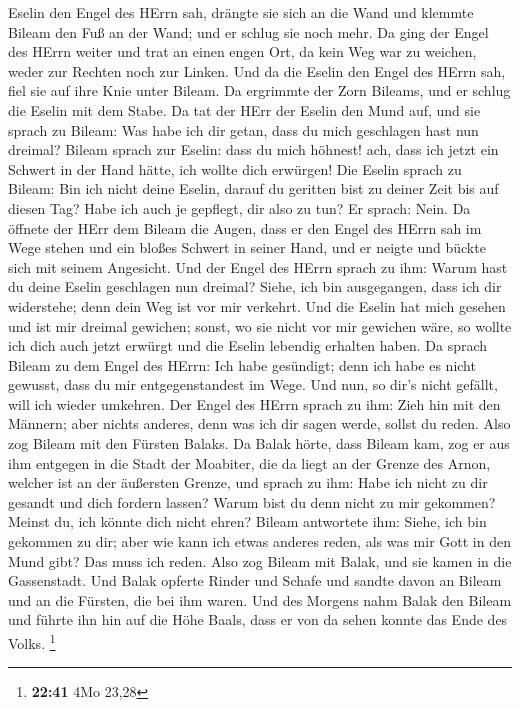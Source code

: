 Eselin den Engel des HErrn sah, drängte sie sich an die Wand und klemmte
Bileam den Fuß an der Wand; und er schlug sie noch mehr. 
Da ging der Engel des HErrn weiter und trat an einen engen Ort, da kein
Weg war zu weichen, weder zur Rechten noch zur Linken.  Und
da die Eselin den Engel des HErrn sah, fiel sie auf ihre Knie unter
Bileam. Da ergrimmte der Zorn Bileams, und er schlug die Eselin mit dem
Stabe.  Da tat der HErr der Eselin den Mund auf, und sie
sprach zu Bileam: Was habe ich dir getan, dass du mich geschlagen hast
nun dreimal?  Bileam sprach zur Eselin: dass du mich
höhnest! ach, dass ich jetzt ein Schwert in der Hand hätte, ich wollte
dich erwürgen!  Die Eselin sprach zu Bileam: Bin ich nicht
deine Eselin, darauf du geritten bist zu deiner Zeit bis auf diesen Tag?
Habe ich auch je gepflegt, dir also zu tun? Er sprach: Nein.
 Da öffnete der HErr dem Bileam die Augen, dass er den
Engel des HErrn sah im Wege stehen und ein bloßes Schwert in seiner
Hand, und er neigte und bückte sich mit seinem Angesicht. 
Und der Engel des HErrn sprach zu ihm: Warum hast du deine Eselin
geschlagen nun dreimal? Siehe, ich bin ausgegangen, dass ich dir
widerstehe; denn dein Weg ist vor mir verkehrt.  Und die
Eselin hat mich gesehen und ist mir dreimal gewichen; sonst, wo sie
nicht vor mir gewichen wäre, so wollte ich dich auch jetzt erwürgt und
die Eselin lebendig erhalten haben.  Da sprach Bileam zu
dem Engel des HErrn: Ich habe gesündigt; denn ich habe es nicht gewusst,
dass du mir entgegenstandest im Wege. Und nun, so dir's nicht gefällt,
will ich wieder umkehren.  Der Engel des HErrn sprach zu
ihm: Zieh hin mit den Männern; aber nichts anderes, denn was ich dir
sagen werde, sollst du reden. Also zog Bileam mit den Fürsten Balaks.
 Da Balak hörte, dass Bileam kam, zog er aus ihm entgegen
in die Stadt der Moabiter, die da liegt an der Grenze des Arnon, welcher
ist an der äußersten Grenze,  und sprach zu ihm: Habe ich
nicht zu dir gesandt und dich fordern lassen? Warum bist du denn nicht
zu mir gekommen? Meinst du, ich könnte dich nicht ehren? 
Bileam antwortete ihm: Siehe, ich bin gekommen zu dir; aber wie kann ich
etwas anderes reden, als was mir Gott in den Mund gibt? Das muss ich
reden.  Also zog Bileam mit Balak, und sie kamen in die
Gassenstadt.  Und Balak opferte Rinder und Schafe und
sandte davon an Bileam und an die Fürsten, die bei ihm waren.
 Und des Morgens nahm Balak den Bileam und führte ihn hin
auf die Höhe Baals, dass er von da sehen konnte das Ende des Volks.
\footnote{\textbf{22:41} 4Mo 23,28}

